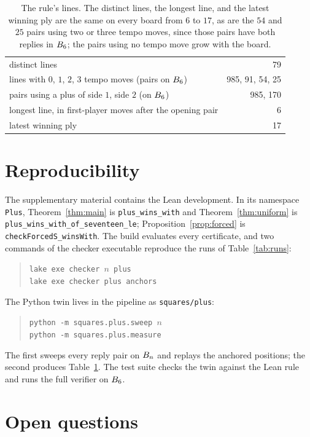 \documentclass[11pt]{amsart}
\theoremstyle{definition}
\theoremstyle{remark}
\begin{document}
\begin{table}[ht]
\centering
\begin{tabular}{lr}
\toprule
distinct lines & 79 \\
lines with $0$, $1$, $2$, $3$ tempo moves (pairs on $B_6$)
  & 985, 91, 54, 25 \\
pairs using a plus of side $1$, side $2$ (on $B_6$) & 985, 170 \\
longest line, in first-player moves after the opening pair & 6 \\
latest winning ply & 17 \\
\bottomrule
\end{tabular}
\medskip
\caption{The rule's lines. The distinct lines, the longest line, and
the latest winning ply are the same on every board from $6$ to $17$,
as are the $54$ and $25$ pairs using two or three tempo moves, since
those pairs have both replies in $B_6$; the pairs using no tempo
move grow with the board.}
\label{tab:lines}
\end{table}

\section{Reproducibility}\label{sec:repro}

The supplementary material contains the Lean development. In its
namespace \texttt{Plus}, Theorem~\ref{thm:main} is
\texttt{plus\_wins\_with} and Theorem~\ref{thm:uniform} is
\texttt{plus\_wins\_with\_of\_seventeen\_le};
Proposition~\ref{prop:forced} is \texttt{checkForcedS\_winsWith}. The
build evaluates every certificate, and two commands of the checker
executable reproduce the runs of Table~\ref{tab:runs}:
\begin{quote}
\texttt{lake exe checker $n$ plus} \\
\texttt{lake exe checker plus anchors}
\end{quote}
The Python twin lives in the pipeline as \texttt{squares/plus}:
\begin{quote}
\texttt{python -m squares.plus.sweep $n$} \\
\texttt{python -m squares.plus.measure}
\end{quote}
The first sweeps every reply pair on $B_n$ and replays the
anchored positions; the second produces Table~\ref{tab:lines}. The
test suite checks the twin against the Lean rule and runs the full
verifier on $B_6$.

\section{Open questions}\label{sec:open}
\end{document}
